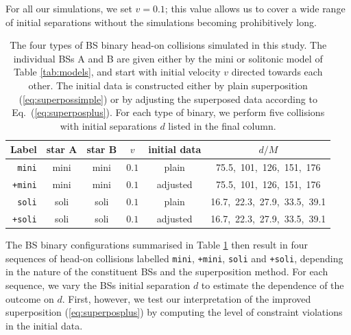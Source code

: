 \documentclass[]{iopart}
\newcommand{\us}[1]{\textcolor{teal}{[{\it\textbf{US: #1}}]} }
\begin{document}
For all our simulations, we
set $v=0.1$; this value
allows us to cover a wide range of initial separations 
without the simulations becoming prohibitively long.
%
\begin{table}[t]
    \centering
    \caption{The four types of BS binary head-on collisions simulated
    in this study. The individual BSs A and B are given either
    by the mini or solitonic model of Table \ref{tab:models},
    and start with initial
    velocity $v$ directed towards each other. The initial data
    is constructed either by plain superposition
    (\ref{eq:superpossimple}) or by adjusting
    the superposed data according to Eq.~(\ref{eq:superposplus}).
    For each type of binary, we perform five collisions with
    initial separations $d$ listed in the final column.
    }
    \begin{tabular}{r|ccccc}
    \hline
    Label & star A & star B & $v$ & initial data & $d/M$ \\
    \hline
    {\tt mini} & mini & mini & $0.1$ & plain &
    75.5,~101,~126,~151,~176 \\
    {\tt +mini}& mini & mini & $0.1$ & adjusted &
    75.5,~101,~126,~151,~176 \\
    {\tt soli} & soli & soli & $0.1$ & plain &
    16.7,~22.3,~27.9,~33.5,~39.1 \\
    {\tt +soli} & soli & soli & $0.1$ &
    adjusted &
    16.7,~22.3,~27.9,~33.5,~39.1 \\
    \hline
    \end{tabular}
    \label{tab:hods}
\end{table}
%
The BS binary configurations
summarised in Table \ref{tab:hods} then result
in four sequences of head-on collisions labelled
{\tt mini}, {\tt +mini}, {\tt soli} and {\tt +soli},
depending in the nature of the constituent BSs and
the superposition method. For each sequence, we vary the
BSs initial separation $d$ to estimate the dependence of the
outcome on $d$. First, however, we test our interpretation
of the improved superposition (\ref{eq:superposplus})
by computing the level of constraint violations in the
initial data.
\end{document}
